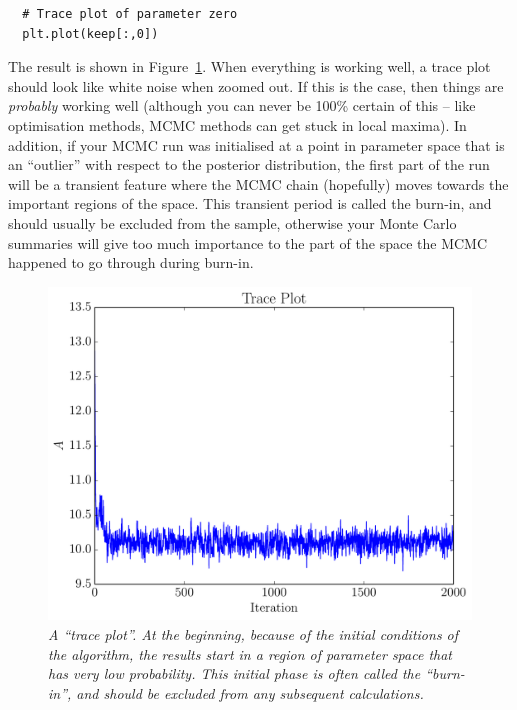 \begin{verbatim}
  # Trace plot of parameter zero
  plt.plot(keep[:,0])
\end{verbatim}
The result is shown in Figure~\ref{fig:trace_plot}. When everything is working
well, a trace plot should look like white noise when zoomed out. If this is the
case, then things are {\it probably} working well (although you can never be
100\% certain of this -- like optimisation methods, MCMC methods can get
stuck in local maxima). In addition, if your MCMC run was initialised at a
point in parameter space that is an ``outlier'' with respect to the posterior
distribution, the first part of the run will be a transient feature where the
MCMC chain (hopefully) moves towards the important regions of the space.
This transient period is called the burn-in, and should usually be excluded
from the sample, otherwise your Monte Carlo summaries will give too much
importance to the part of the space the MCMC happened to go through during
burn-in.

\begin{figure}
\begin{center}
\includegraphics[scale=0.45]{trace_plot.pdf}
\caption{\it A ``trace plot''. At the beginning, because of the initial conditions
of the algorithm, the results start in a region of parameter space that has
very low probability. This initial phase is often called the ``burn-in'', and
should be excluded from any subsequent calculations.\label{fig:trace_plot}}
\end{center}
\end{figure}

